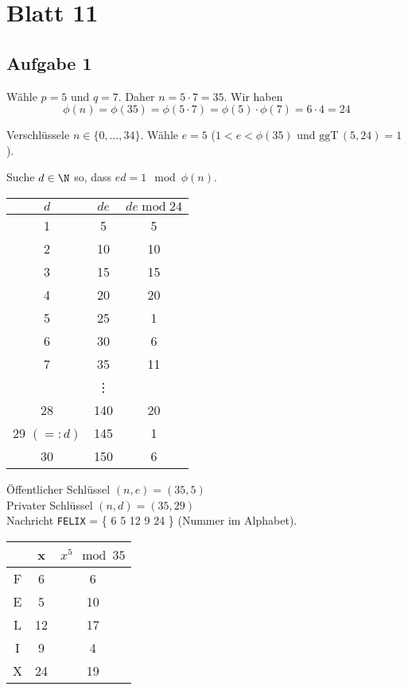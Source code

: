\section*{Blatt 11}
%

\subsection*{Aufgabe 1}

Wähle $p=5$ und $q=7$. Daher $n = 5 \cdot 7 = 35$. Wir haben
\[
  \phi(n) = \phi(35) = \phi(5 \cdot 7) = \phi(5) \cdot \phi(7) = 6 \cdot 4 = 24
\]

Verschlüssele $n \in \{0, \ldots, 34\}$. Wähle $e = 5$ ($1 < e < \phi(35)$  und $\text{ggT}\, (5,24) = 1$).

Suche $d \in \N$ so, dass $ed = 1 \mod \phi(n)$.
\begin{center}
\begin{tabular}{c c c
}

$d$ & $de$ & $de \; \text{mod}\; 24$ \\
\hline
1 & 5 & 5 \\
2 & 10 & 10 \\
3 & 15 & 15 \\
4 & 20 & 20 \\
5 & 25 & 1 \\
6 & 30 & 6 \\
7 & 35 & 11 \\
& \vdots & \\
28 & 140 & 20 \\
29 $ (=: d) $ & 145 & 1 \\
30 & 150 & 6 \\

\end{tabular}
\end{center}

Öffentlicher Schlüssel $(n, e) = (35,5)$ \\
Privater Schlüssel $(n,d) = (35, 29)$ \\

Nachricht \texttt{FELIX} = \{ 6 5 12 9 24 \} (Nummer im Alphabet).

\begin{center}
  \begin{tabular}{ccc}
    & x & $x^5 \mod 35$ \\
    \hline
    F & 6 & 6 \\
    E & 5 & 10 \\
    L & 12 & 17 \\
    I & 9 & 4 \\
    X & 24 & 19 \\
  \end{tabular}
\end{center}

